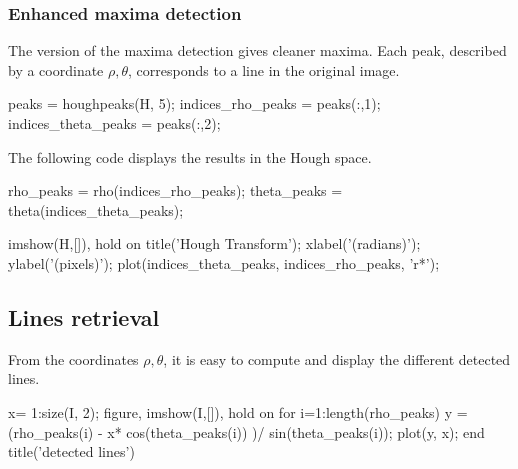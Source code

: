 \subsubsection{Enhanced maxima detection}
The \matlabregistered{} version of the maxima detection gives cleaner maxima. Each peak, described by a coordinate $\rho, \theta$, corresponds to a line in the original image.
\begin{matlab}
peaks = houghpeaks(H, 5);
indices_rho_peaks   = peaks(:,1);
indices_theta_peaks = peaks(:,2);
\end{matlab}
The following code displays the results in the Hough space.
\begin{matlab}
rho_peaks   = rho(indices_rho_peaks);
theta_peaks = theta(indices_theta_peaks);

imshow(H,[]), hold on
title('Hough Transform');
xlabel('\theta (radians)');
ylabel('\rho (pixels)');
plot(indices_theta_peaks, indices_rho_peaks, 'r*');
\end{matlab}

\subsection{Lines retrieval}
From the coordinates $\rho, \theta$, it is easy to compute and display the different detected lines.
\begin{matlab}
x= 1:size(I, 2);
figure, imshow(I,[]), hold on
for i=1:length(rho_peaks)
    y = (rho_peaks(i) - x* cos(theta_peaks(i)) )/ sin(theta_peaks(i));
    plot(y, x);
end
title('detected lines')
\end{matlab}
